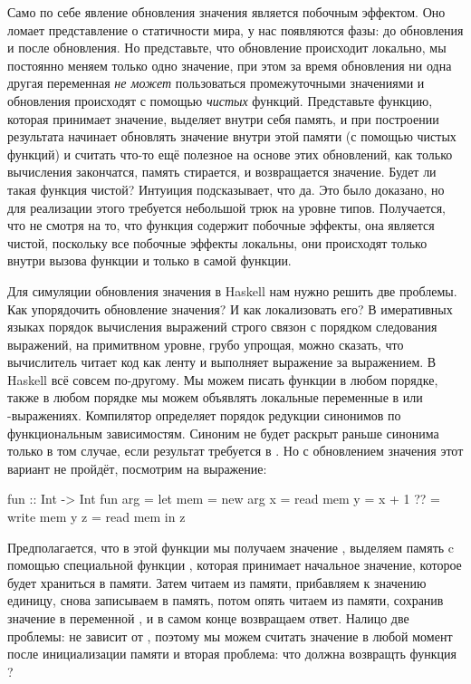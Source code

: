 Само по себе явление обновления значения является побочным
эффектом. Оно ломает представление о статичности мира,
у нас появляются фазы: до обновления и после обновления. 
Но представьте, что обновление происходит локально, 
мы постоянно меняем только одно значение, при этом за
время обновления ни одна другая переменная \emph{не может}
пользоваться промежуточными значениями и обновления происходят
с помощью \emph{чистых} функций. Представьте функцию, 
которая принимает значение, выделяет внутри себя память,
и при построении результата начинает обновлять значение 
внутри этой памяти (с помощью чистых функций) и считать 
что-то ещё полезное на основе этих обновлений, как только 
вычисления закончатся, память стирается, и возвращается
значение. Будет ли такая функция чистой? Интуиция
подсказывает, что да. Это было доказано, но для реализации 
этого требуется небольшой трюк на уровне типов. 
Получается, что не смотря на то, что функция содержит 
побочные эффекты, она является чистой, поскольку 
все побочные эффекты локальны, они происходят только 
внутри вызова функции и только в самой функции.

Для симуляции обновления значения в Haskell
нам нужно решить две проблемы. Как упорядочить обновление 
значения? И как локализовать его? В имеративных
языках порядок вычисления выражений строго связон с порядком
следования выражений, на примитвном уровне, грубо упрощая,
можно сказать, что вычислитель читает код как ленту
и выполняет выражение за выражением. В Haskell всё совсем
по-другому. Мы можем писать функции в любом порядке, также
в любом порядке мы можем объявлять локальные переменные в
 или -выражениях. Компилятор определяет
порядок редукции синонимов по функциональным зависимостям. 
Синоним  не будет раскрыт раньше синонима 
только в том случае, если результат  требуется в .
Но с обновлением значения этот вариант не пройдёт, посмотрим
на выражение:

\begin{code}
fun :: Int -> Int
fun arg = 
    let mem = new arg
        x   = read mem
        y   = x + 1
        ??  = write mem y
        z   = read mem
    in z
\end{code}

Предполагается, что в этой функции мы получаем значение ,
выделяем память  c помощью специальной функции 
, которая принимает начальное значение,
которое будет храниться в памяти. 
Затем читаем из памяти, прибавляем к значению единицу, снова
записываем в память, потом опять читаем из памяти, сохранив
значение в переменной , и в самом конце возвращаем ответ. 
Налицо две проблемы:
 не зависит от , поэтому мы можем считать 
значение  в любой момент после инициализации памяти и
вторая проблема: что должна возвращть функция ?

